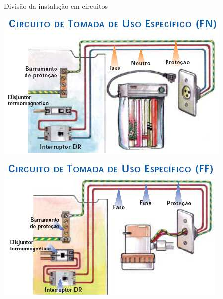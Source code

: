 \begin{frame}{Divisão da instalação em circuitos}
	\begin{minipage}{0.49\linewidth}
		\centering
		\includegraphics[width=1\linewidth]{Figuras/Ch05/fig13}
	\end{minipage}\hfill
	\begin{minipage}{0.49\linewidth}
		\centering
		\includegraphics[width=1\linewidth]{Figuras/Ch05/fig14}
	\end{minipage}
\end{frame}


